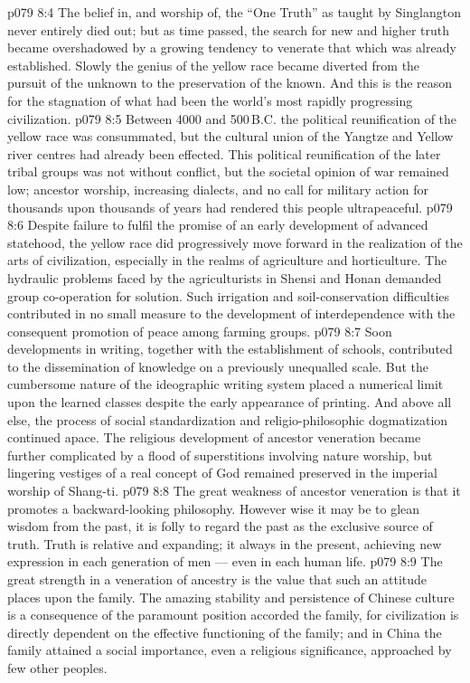 \vs p079 8:4 The belief in, and worship of, the “One Truth” as taught by Singlangton never entirely died out; but as time passed, the search for new and higher truth became overshadowed by a growing tendency to venerate that which was already established. Slowly the genius of the yellow race became diverted from the pursuit of the unknown to the preservation of the known. And this is the reason for the stagnation of what had been the world’s most rapidly progressing civilization.
\vs p079 8:5 \pc Between 4000 and 500\,B.C. the political reunification of the yellow race was consummated, but the cultural union of the Yangtze and Yellow river centres had already been effected. This political reunification of the later tribal groups was not without conflict, but the societal opinion of war remained low; ancestor worship, increasing dialects, and no call for military action for thousands upon thousands of years had rendered this people ultrapeaceful.
\vs p079 8:6 Despite failure to fulfil the promise of an early development of advanced statehood, the yellow race did progressively move forward in the realization of the arts of civilization, especially in the realms of agriculture and horticulture. The hydraulic problems faced by the agriculturists in Shensi and Honan demanded group co\hyp{}operation for solution. Such irrigation and soil\hyp{}conservation difficulties contributed in no small measure to the development of interdependence with the consequent promotion of peace among farming groups.
\vs p079 8:7 Soon developments in writing, together with the establishment of schools, contributed to the dissemination of knowledge on a previously unequalled scale. But the cumbersome nature of the ideographic writing system placed a numerical limit upon the learned classes despite the early appearance of printing. And above all else, the process of social standardization and religio\hyp{}philosophic dogmatization continued apace. The religious development of ancestor veneration became further complicated by a flood of superstitions involving nature worship, but lingering vestiges of a real concept of God remained preserved in the imperial worship of Shang\hyp{}ti.
\vs p079 8:8 The great weakness of ancestor veneration is that it promotes a backward\hyp{}looking philosophy. However wise it may be to glean wisdom from the past, it is folly to regard the past as the exclusive source of truth. Truth is relative and expanding; it  always in the present, achieving new expression in each generation of men --- even in each human life.
\vs p079 8:9 The great strength in a veneration of ancestry is the value that such an attitude places upon the family. The amazing stability and persistence of Chinese culture is a consequence of the paramount position accorded the family, for civilization is directly dependent on the effective functioning of the family; and in China the family attained a social importance, even a religious significance, approached by few other peoples.
